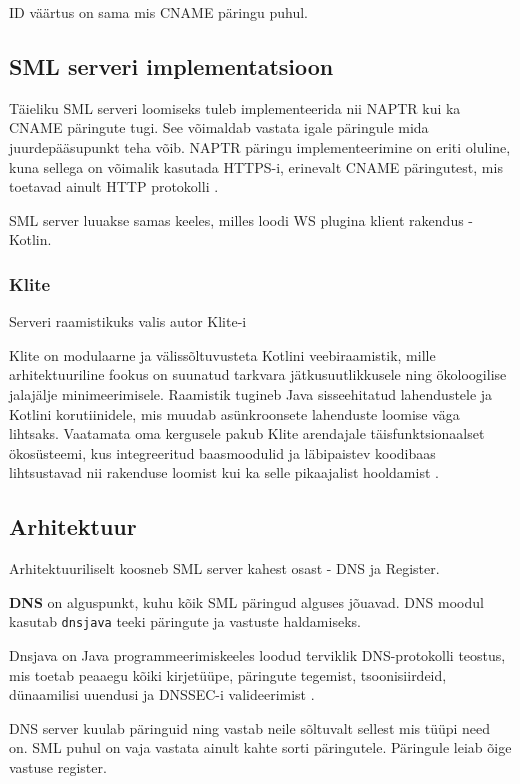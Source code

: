 ID väärtus on sama mis CNAME päringu puhul.


\subsection{SML serveri implementatsioon}
Täieliku SML serveri loomiseks tuleb implementeerida nii NAPTR kui ka CNAME päringute tugi.
See võimaldab vastata igale päringule mida juurdepääsupunkt teha võib. 
NAPTR päringu implementeerimine on eriti oluline, kuna sellega on võimalik kasutada HTTPS-i, 
erinevalt CNAME päringutest, mis toetavad ainult HTTP protokolli \cite{ionite_sml_2024}.

SML server luuakse samas keeles, milles loodi WS plugina klient rakendus - Kotlin.

\subsubsection{Klite}
Serveri raamistikuks valis autor Klite-i

Klite on modulaarne ja välissõltuvusteta Kotlini veebiraamistik, 
mille arhitektuuriline fookus on suunatud tarkvara jätkusuutlikkusele 
ning ökoloogilise jalajälje minimeerimisele. Raamistik tugineb Java sisseehitatud lahendustele
ja Kotlini korutiinidele, mis muudab asünkroonsete lahenduste loomise väga lihtsaks.
Vaatamata oma kergusele pakub Klite arendajale täisfunktsionaalset ökosüsteemi,
kus integreeritud baasmoodulid ja läbipaistev koodibaas lihtsustavad nii rakenduse loomist 
kui ka selle pikaajalist hooldamist \cite{klite_readme}.


\subsection{Arhitektuur}
Arhitektuuriliselt koosneb SML server kahest osast - DNS ja Register.


\textbf{DNS} on alguspunkt, kuhu kõik SML päringud alguses jõuavad.
DNS moodul kasutab \texttt{dnsjava} teeki päringute ja vastuste haldamiseks.

Dnsjava on Java programmeerimiskeeles loodud terviklik DNS-protokolli teostus,
mis toetab peaaegu kõiki kirjetüüpe, päringute tegemist, tsoonisiirdeid, dünaamilisi uuendusi
ja DNSSEC-i valideerimist \cite{dnsjava_lib}.

DNS server kuulab päringuid ning vastab neile sõltuvalt sellest mis tüüpi need on. 
SML puhul on vaja vastata ainult kahte sorti päringutele. 
Päringule leiab õige vastuse register.


